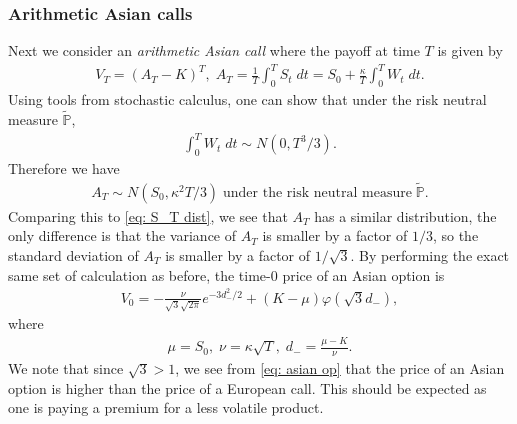 \documentclass[reqno]{amsart}
\begin{document}
\subsubsection{Arithmetic Asian calls}
Next we consider an \emph{arithmetic Asian call} where the payoff at time $T$ is given by 
\begin{align} \label{eq: asian}
	 V_T = (A_T - K)^T, \; A_T = \frac{1}{T}\int_0^T S_t \; dt = S_0 + \frac{\kappa}{T} \int_0^T W_t \; dt. 
\end{align}
Using tools from stochastic calculus, one can show that under the risk neutral measure $\tilde{\mathbb{P}}$, 
\begin{align}
	 \int_0^T W_t \; dt \sim N(0, T^3/3).
\end{align}
Therefore we have 
\begin{align}
	 A_T \sim N(S_0, \kappa^2 T/3) \; \text{under the risk neutral measure} \; \tilde{\mathbb{P}}.
\end{align}
Comparing this to \eqref{eq: S_T dist}, we see that $A_T$ has a similar distribution, the only difference is that the variance of $A_T$ is smaller by a factor of $1/3$, so the standard deviation of $A_T$ is smaller by a factor of $1/\sqrt{3}$. By performing the exact same set of calculation as before, the time-0 price of an Asian option is 
\begin{align} \label{eq: asian op}
	 V_0 = -\frac{\nu}{\sqrt{3}\sqrt{2\pi}} e^{-3d_-^2/2} + (K-\mu) \varphi(\sqrt{3}d_-),
\end{align}
where 
\begin{align}
	 \mu = S_0, \; \nu = \kappa \sqrt{T}, \; d_- = \frac{\mu - K}{\nu}.
\end{align}
We note that since $\sqrt{3} > 1$, we see from \eqref{eq: asian op} that the price of an Asian option is higher than the price of a European call. This should be expected as one is paying a premium for a less volatile product. 
\end{document}
